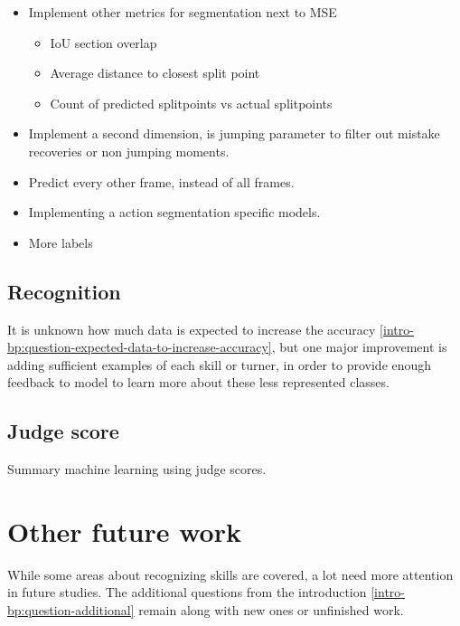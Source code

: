 \begin{itemize}
    \item Implement other metrics for segmentation next to MSE \\
        \begin{itemize}
            \item IoU section overlap
            \item Average distance to closest split point
            \item Count of predicted splitpoints vs actual splitpoints
        \end{itemize}
    \item Implement a second dimension, is jumping parameter to filter out mistake recoveries or non jumping moments.
    \item Predict every other frame, instead of all frames.
    \item Implementing a action segmentation specific models.
    \item More labels
\end{itemize} 

\subsection{Recognition}





It is unknown how much data is expected to increase the accuracy \ref{intro-bp:question-expected-data-to-increase-accuracy}, but one major improvement is adding sufficient examples of each skill or turner, in order to provide enough feedback to model to learn more about these less represented classes.

\subsection{Judge score}


Summary machine learning using judge scores.

\section{Other future work}
\label{discussion:future-work}

While some areas about recognizing skills are covered, a lot need more attention in future studies. The additional questions from the introduction \ref{intro-bp:question-additional} remain along with new ones or unfinished work.

